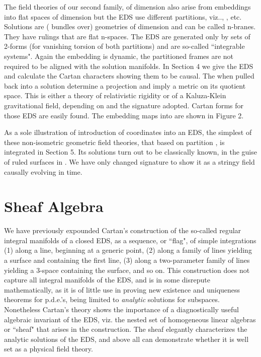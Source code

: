 \documentclass[a4paper,a4paper]{article}
\begin{document}
        The field theories of our second family,  of dimension \coordHE{} also arise from embeddings into flat spaces  \coordHE{} of
dimension \coordHE{} but the EDS use different partitions,
viz..,  \coordHE{},  etc.   Solutions
are (\coordHE{} bundles over) geometries  of dimension \coordHE{} 
and can be called n-branes.  They have rulings that are flat n-spaces.  The EDS
are generated only by sets of 2-forms (for vanishing torsion of both
partitions) and are so-called ``integrable systems".  Again
the embedding is dynamic,  the partitioned frames are not required to be aligned with
the solution manifolds.  In Section 4 we give the EDS and calculate the
Cartan characters showing them to be causal.   The  \coordHE{}  \coordHE{} when
pulled back into a  solution determine a projection and  imply a metric
\coordHE{} on its quotient space.  This is either  a theory of
relativistic rigidity or of a Kaluza-Klein gravitational field, depending
on \coordHE{} and the signature adopted.   Cartan forms for those EDS are  easily
found.  The  embedding maps into \coordHE{} are shown in Figure 2.

        As a sole illustration of introduction of coordinates into an
EDS,  the simplest of these non-isometric geometric field theories,
that  based on partition \coordHE{},  is integrated in Section 5.  Its solutions turn out
to be classically known,  in the guise of ruled surfaces in \coordHE{}.  We
have only changed signature to show it as a stringy field causally evolving
in time.

\section{Sheaf Algebra}

        We have previously expounded \cite{est89} Cartan's construction
of the so-called regular integral manifolds of a closed EDS,  as a
sequence,  or ``flag",  of simple  integrations (1) along a line,  beginning at a generic point,
(2) along a family of lines yielding a surface and containing the first
line, (3) along a two-parameter family of lines yielding a 3-space containing
the surface,  and so on.  This construction does not capture all
integral manifolds of the EDS,  and is in some disrepute mathematically,  as it
is of little use in proving new existence and uniqueness theorems for
p.d.e.'s, being limited to {\itshape analytic} solutions for subspaces.
Nonetheless Cartan's  theory shows the importance of a diagnostically
useful algebraic invariant of the EDS,  viz. the nested set of homogeneous linear
algebras or ``sheaf" that arises in the construction.  The sheaf
elegantly characterizes the analytic solutions of the EDS,  and above all can demonstrate
whether it is well set as a physical field theory.
\end{document}

